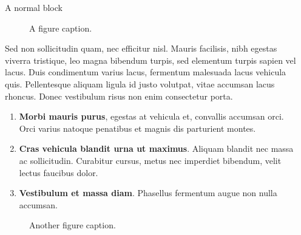 \documentclass[final]{beamer}
\newlength{\sepwidth}
\newlength{\colwidth}
\newcommand{\separatorcolumn}{\begin{column}{\sepwidth}\end{column}}
\begin{document}
\begin{frame}[t]
\begin{columns}[t]
\begin{column}{\colwidth}
\begin{block}{A normal block}
    \begin{figure}
        \centering
{}
        \caption{A figure caption.}
        \label{fig:my_label}
    \end{figure}
Sed non sollicitudin quam, nec efficitur nisl. Mauris facilisis, nibh egestas viverra tristique, leo magna bibendum turpis, sed elementum turpis sapien vel lacus. Duis condimentum varius lacus, fermentum malesuada lacus vehicula quis. Pellentesque aliquam ligula id justo volutpat, vitae accumsan lacus rhoncus. Donec vestibulum risus non enim consectetur porta. 
    \begin{enumerate}
      \item \textbf{Morbi mauris purus}, egestas at vehicula et, convallis
        accumsan orci. Orci varius natoque penatibus et magnis dis parturient
        montes.
      \item \textbf{Cras vehicula blandit urna ut maximus}. Aliquam blandit nec
        massa ac sollicitudin. Curabitur cursus, metus nec imperdiet bibendum,
        velit lectus faucibus dolor.
      \item \textbf{Vestibulum et massa diam}. Phasellus fermentum augue non
        nulla accumsan.
    \end{enumerate}

\begin{figure}
    \centering
{}
    \caption{Another figure caption.}
    \label{fig:my_label}
\end{figure}

  \end{block}




\end{column}

\separatorcolumn
\end{columns}
\end{frame}
\end{document}

